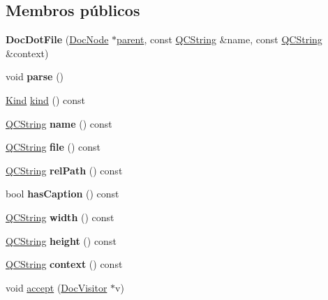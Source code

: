 \subsection*{Membros públicos}
\begin{DoxyCompactItemize}
\item 
\hypertarget{class_doc_dot_file_a84098690eb63411b71b5e9c64b1cbd78}{{\bfseries Doc\-Dot\-File} (\hyperlink{class_doc_node}{Doc\-Node} $\ast$\hyperlink{class_doc_node_abd7f070d6b0a38b4da71c2806578d19d}{parent}, const \hyperlink{class_q_c_string}{Q\-C\-String} \&name, const \hyperlink{class_q_c_string}{Q\-C\-String} \&context)}\label{class_doc_dot_file_a84098690eb63411b71b5e9c64b1cbd78}

\item 
\hypertarget{class_doc_dot_file_ad7c704b34912678d95c13243cacf9d7f}{void {\bfseries parse} ()}\label{class_doc_dot_file_ad7c704b34912678d95c13243cacf9d7f}

\item 
\hyperlink{class_doc_node_aa10c9e8951b8ccf714a59ec321bdac5b}{Kind} \hyperlink{class_doc_dot_file_aa9d037bed9f9a083d0cd01485637d843}{kind} () const 
\item 
\hypertarget{class_doc_dot_file_af92302878527ec555ba9e3fe066925ff}{\hyperlink{class_q_c_string}{Q\-C\-String} {\bfseries name} () const }\label{class_doc_dot_file_af92302878527ec555ba9e3fe066925ff}

\item 
\hypertarget{class_doc_dot_file_aeaa8cdb0fbabc1058b7d3813f2fd223b}{\hyperlink{class_q_c_string}{Q\-C\-String} {\bfseries file} () const }\label{class_doc_dot_file_aeaa8cdb0fbabc1058b7d3813f2fd223b}

\item 
\hypertarget{class_doc_dot_file_a3aa6799d4713d51d9cc4862af165671c}{\hyperlink{class_q_c_string}{Q\-C\-String} {\bfseries rel\-Path} () const }\label{class_doc_dot_file_a3aa6799d4713d51d9cc4862af165671c}

\item 
\hypertarget{class_doc_dot_file_a47d6a6a9de9fe305f0a40bc7ab568e28}{bool {\bfseries has\-Caption} () const }\label{class_doc_dot_file_a47d6a6a9de9fe305f0a40bc7ab568e28}

\item 
\hypertarget{class_doc_dot_file_a3b2930dfedd2909fb77430aee4aba6fa}{\hyperlink{class_q_c_string}{Q\-C\-String} {\bfseries width} () const }\label{class_doc_dot_file_a3b2930dfedd2909fb77430aee4aba6fa}

\item 
\hypertarget{class_doc_dot_file_ab6aa5410ea982fcf57c2dbb7e9701858}{\hyperlink{class_q_c_string}{Q\-C\-String} {\bfseries height} () const }\label{class_doc_dot_file_ab6aa5410ea982fcf57c2dbb7e9701858}

\item 
\hypertarget{class_doc_dot_file_a4d6bb4ed13678cf22ef5cb414076d9f5}{\hyperlink{class_q_c_string}{Q\-C\-String} {\bfseries context} () const }\label{class_doc_dot_file_a4d6bb4ed13678cf22ef5cb414076d9f5}

\item 
void \hyperlink{class_doc_dot_file_a7ba716e854ae2f8f87a4eb2140e302b6}{accept} (\hyperlink{class_doc_visitor}{Doc\-Visitor} $\ast$v)
\end{DoxyCompactItemize}
